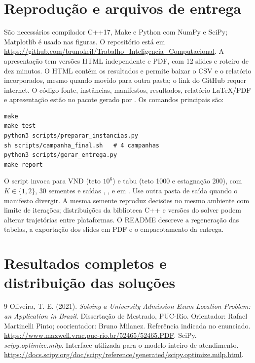 \documentclass[12pt]{article}
\begin{document}
\section{Reprodução e arquivos de entrega}
\label{sec:repro}
São necessários compilador C++17, Make e Python com NumPy e SciPy; Matplotlib é usado nas figuras. O repositório está em \url{https://github.com/brunokeil/Trabalho_Inteligencia_Computacional}. A apresentação tem versões HTML independente e PDF, com 12 slides e roteiro de dez minutos. O HTML contém os resultados e permite baixar o CSV e o relatório incorporados, mesmo quando movido para outra pasta; o link do GitHub requer internet. O código-fonte, instâncias, manifestos, resultados, relatório LaTeX/PDF e apresentação estão no pacote gerado por . Os comandos principais são:
\begin{verbatim}
make
make test
python3 scripts/preparar_instancias.py
sh scripts/campanha_final.sh   # 4 campanhas
python3 scripts/gerar_entrega.py
make report
\end{verbatim}
O script  invoca  para VND (teto $10^6$) e tabu (teto 1000 e estagnação 200), com $K\in\{1,2\}$, 30 sementes e saídas , ,  e  em .
Use outra pasta de saída quando o manifesto divergir. A mesma semente reproduz decisões no mesmo ambiente com limite de iterações; distribuições da biblioteca C++ e versões do solver podem alterar trajetórias entre plataformas. O README descreve a regeneração das tabelas, a exportação dos slides em PDF e o empacotamento da entrega.

\appendix
\section{Resultados completos e distribuição das soluções}

\begin{thebibliography}{9}
 Oliveira, T. E. (2021). \textit{Solving a University Admission Exam Location Problem: an Application in Brazil}. Dissertação de Mestrado, PUC-Rio. Orientador: Rafael Martinelli Pinto; coorientador: Bruno Milanez. Referência indicada no enunciado. \url{https://www.maxwell.vrac.puc-rio.br/52465/52465.PDF}.
 SciPy. \textit{scipy.optimize.milp}. Interface utilizada para o modelo inteiro de atendimento. \url{https://docs.scipy.org/doc/scipy/reference/generated/scipy.optimize.milp.html}.
\end{thebibliography}
\end{document}
